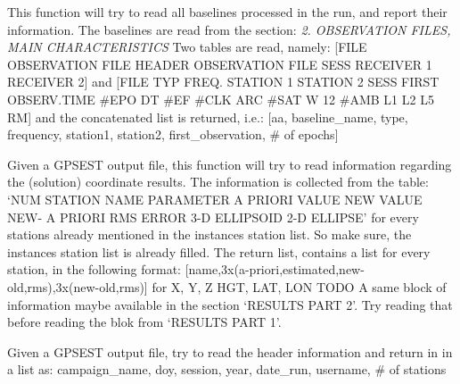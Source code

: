 \documentclass[letterpaper,10pt,english]{sphinxmanual}
\begin{document}
\begin{fulllineitems}
\begin{fulllineitems}
\label{bgps:bgps.gpsoutfile.getBaselineList}
This function will try to read all baselines processed in the run, 
and report their information. The baselines are read from the 
section:
\emph{2. OBSERVATION FILES, MAIN CHARACTERISTICS}
Two tables are read, namely:
{[}FILE  OBSERVATION FILE HEADER          OBSERVATION FILE                  SESS     RECEIVER 1            RECEIVER 2{]}
and
{[}FILE TYP FREQ.  STATION 1        STATION 2        SESS  FIRST OBSERV.TIME  \#EPO  DT \#EF \#CLK ARC \#SAT  W 12    \#AMB  L1  L2  L5  RM{]}
and the concatenated list is returned, i.e.:
{[}aa, baseline\_name, type, frequency, station1, station2, first\_observation, \# of epochs{]}

\end{fulllineitems}


\begin{fulllineitems}
\label{bgps:bgps.gpsoutfile.getCrdSolInfo}
Given a GPSEST output file, this function will try to read information regarding the
(solution) coordinate results. The information is collected from the table:
`NUM  STATION NAME     PARAMETER    A PRIORI VALUE       NEW VALUE     NEW- A PRIORI  RMS ERROR   3-D ELLIPSOID       2-D ELLIPSE'
for every stations already mentioned in the instances station list. So make sure,
the instances station list is already filled. The return list, contains
a list for every station, in the following format:
{[}name,3x(a-priori,estimated,new-old,rms),3x(new-old,rms){]}
for   X, Y, Z                            HGT, LAT, LON
TODO A same block of information maybe available in the section `RESULTS PART 2'. Try reading that
before reading the blok from `RESULTS PART 1'.

\end{fulllineitems}


\begin{fulllineitems}
\label{bgps:bgps.gpsoutfile.getHeaderInfo}
Given a GPSEST output file, try to read the header
information and return in in a list as:
campaign\_name, doy, session, year, date\_run, username, \# of stations

\end{fulllineitems}


\end{fulllineitems}
\end{document}
